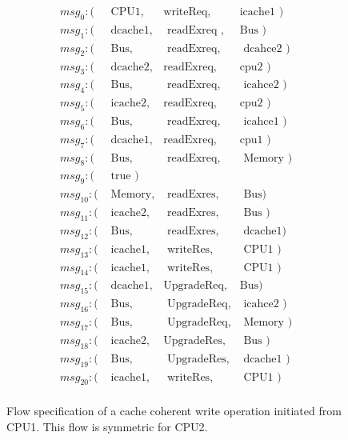 \documentclass[conference]{IEEEtran}
\begin{document}
\begin{figure}
 {\footnotesize
 \[
 \begin{array}{llll}
 msg_0: (&\mbox{ CPU1},&\mbox{writeReq},&\mbox{icache1   })\\       
 msg_1: (&\mbox{ dcache1},&\mbox{ readExreq },&\mbox{Bus     })\\        
 msg_2: (&\mbox{ Bus},&\mbox{ readExreq},&\mbox{ dcahce2 })\\  
 msg_3: (&\mbox{ dcache2},&\mbox{readExreq},&\mbox{cpu2         })\\   
 msg_4: (&\mbox{ Bus},&\mbox{ readExreq},&\mbox{ icahce2           })\\  
 msg_5: (&\mbox{ icache2},&\mbox{readExreq},&\mbox{cpu2 })\\  
 msg_6: (&\mbox{ Bus},&\mbox{ readExreq},&\mbox{ icahce1       })\\     
 msg_7: (&\mbox{ dcache1},&\mbox{readExreq},&\mbox{cpu1           })\\  
 msg_8: (&\mbox{ Bus},&\mbox{ readExreq},&\mbox{ Memory })\\  
 msg_9: (&\mbox{ true                                          })\\  
 msg_{10}: (&\mbox{ Memory},&\mbox{ readExres},&\mbox{ Bus})\\  
 msg_{11}: (&\mbox{ icache2},&\mbox{ readExres},&\mbox{ Bus })\\  
 msg_{12}: (&\mbox{ Bus},&\mbox{ readExres},&\mbox{ dcache1})\\  
 msg_{13}: (&\mbox{ icache1},&\mbox{ writeRes},&\mbox{ CPU1         })\\  
 msg_{14}: (&\mbox{ icache1},&\mbox{ writeRes},&\mbox{ CPU1 })\\  
 msg_{15}: (&\mbox{ dcache1},&\mbox{UpgradeReq},&\mbox{Bus})\\  
 msg_{16}: (&\mbox{ Bus},&\mbox{ UpgradeReq},&\mbox{ icahce2      })\\   
 msg_{17}: (&\mbox{ Bus},&\mbox{ UpgradeReq},&\mbox{ Memory })\\  
 msg_{18}: (&\mbox{ icache2},&\mbox{UpgradeRes},&\mbox{ Bus     })\\  
 msg_{19}: (&\mbox{ Bus},&\mbox{ UpgradeRes},&\mbox{ dcache1      })\\  
 msg_{20}: (&\mbox{ icache1},&\mbox{ writeRes},&\mbox{ CPU1 })\\  
 \end{array}
 \]}
 \caption{Flow specification of a cache coherent write operation initiated from CPU1. This flow is symmetric for CPU2. }
 \label{write-flow}
 \end{figure}
\end{document}
